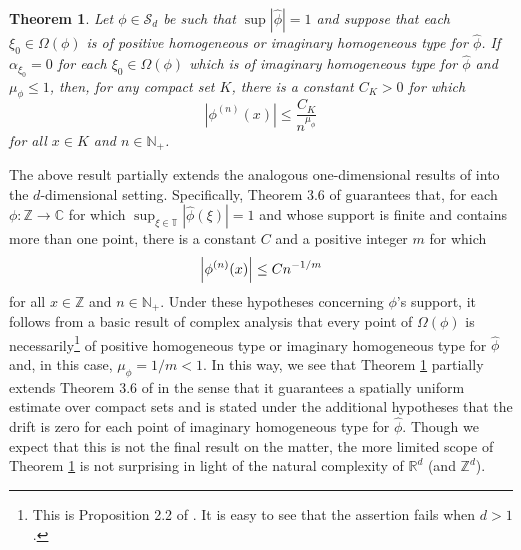 \documentclass[11pt, letter]{book}
\newtheorem{theorem}{Theorem}[section]
\begin{document}
\begin{framed}
\begin{theorem}\label{thm:ConvolutionPowerEstimate}
Let $\phi\in\mathcal{S}_d$ be such that $\sup |\widehat{\phi}|=1$ and suppose that each $\xi_0\in\Omega(\phi)$ is of positive homogeneous or imaginary homogeneous type for $\widehat{\phi}$. If $\alpha_{\xi_0}=0$ for each $\xi_0\in\Omega(\phi)$ which is of imaginary homogeneous type for $\widehat{\phi}$ and $\mu_{\phi}\leq 1$, then, for any compact set $K$, there is a constant $C_K>0$ for which
\begin{equation*}
    \left|\phi^{(n)}(x)\right|\leq\frac{C_K}{n^{\mu_\phi}}
\end{equation*}
for all $x\in K$ and $n\in\mathbb{N}_+$.
\end{theorem}
\end{framed}

\noindent The above result partially extends the analogous one-dimensional results of \cite{randles_convolution_2015} into the $d$-dimensional setting. Specifically, Theorem 3.6 of \cite{randles_convolution_2015} guarantees that, for each $\phi:\mathbb{Z}\to\mathbb{C}$ for which $\sup_{\xi\in\mathbb{T}}|\widehat{\phi}(\xi)|=1$ and whose support is finite and contains more than one point, there is a constant $C$ and a positive integer $m$ for which
\begin{equation*}
    \abs{\phi^{(n)}(x)}\leq Cn^{-1/m}
\end{equation*}
for all $x\in\mathbb{Z}$ and $n\in\mathbb{N}_+$. Under these hypotheses concerning $\phi$'s support, it follows from a basic result of complex analysis that every point of $\Omega(\phi)$ is necessarily\footnote{This is Proposition 2.2 of \cite{randles_convolution_2015}. It is easy to see that the assertion fails when $d>1$.} of positive homogeneous type or imaginary homogeneous type for $\widehat{\phi}$ and, in this case, $\mu_\phi=1/m<1$. In this way, we see that Theorem \ref{thm:ConvolutionPowerEstimate} partially extends Theorem 3.6 of \cite{randles_convolution_2015} in the sense that it guarantees a spatially uniform estimate over compact sets and is stated under the additional hypotheses that the drift is zero for each point of imaginary homogeneous type for $\widehat{\phi}$. Though we expect that this is not the final result on the matter, the more limited scope of Theorem \ref{thm:ConvolutionPowerEstimate} is not surprising in light of the natural complexity of $\mathbb{R}^d$ (and $\mathbb{Z}^d$).\\
\end{document}
